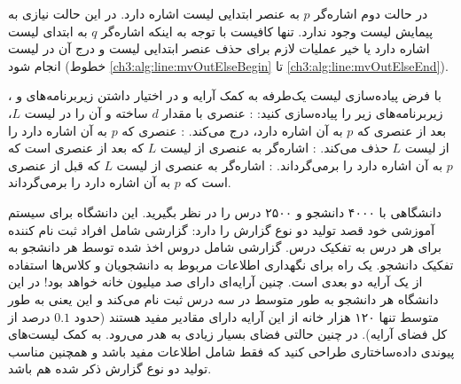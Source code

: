 {در حالت دوم اشاره‌گر {$p$} به عنصر ابتدایی لیست {} اشاره دارد. در این حالت نیازی به پیمایش لیست {} وجود ندارد. تنها کافیست با توجه به اینکه اشاره‌گر {$q$} به ابتدای لیست {} اشاره دارد یا خیر عملیات لازم برای حذف عنصر ابتدایی لیست {} و درج آن در لیست {} انجام شود (خطوط {\ref{ch3:alg:line:mvOutElseBegin}} تا {\ref{ch3:alg:line:mvOutElseEnd}}).

 با فرض پیاده‌سازی لیست یک‌طرفه به کمک آرایه و در اختیار داشتن زیربرنامه‌های {} و {}، زیربرنامه‌های زیر را پیاده‌سازی کنید:
: عنصری با مقدار {$d$} ساخته و آن را در لیست {$L$}، بعد از عنصری که {$p$} به آن اشاره دارد، درج می‌کند.
: عنصری که {$p$} به آن اشاره دارد را از لیست {$L$} حذف می‌کند.
: اشاره‌گر به عنصری از لیست {$L$} که بعد از عنصری است که {$p$} به آن اشاره دارد را برمی‌گرداند.
: اشاره‌گر به عنصری از لیست {$L$} که قبل از عنصری است که {$p$} به آن اشاره دارد را برمی‌گرداند.


 دانشگاهی با ۴۰۰۰ دانشجو و ۲۵۰۰ درس را در نظر بگیرید. این دانشگاه برای سیستم آموزشی خود قصد تولید دو نوع گزارش را دارد:
 گزارشی شامل افراد ثبت نام کننده برای هر درس به تفکیک درس.
 گزارشی شامل دروس اخذ شده توسط هر دانشجو به تفکیک دانشجو.
یک راه برای نگهداری اطلاعات مربوط به دانشجویان و کلاس‌ها استفاده از یک آرایه دو بعدی است. چنین آرایه‌ای دارای صد میلیون خانه خواهد بود! در این دانشگاه هر دانشجو به طور متوسط در سه درس ثبت نام می‌کند و این یعنی به طور متوسط تنها ۱۲۰ هزار خانه از این آرایه دارای مقادیر مفید هستند (حدود {$0.1$} درصد از کل فضای آرایه). در چنین حالتی فضای بسیار زیادی به هدر می‌رود. به کمک لیست‌های پیوندی داده‌ساختاری طراحی کنید که فقط شامل اطلاعات مفید باشد و همچنین مناسب تولید دو نوع گزارش ذکر شده هم باشد.


}
